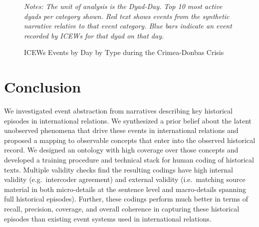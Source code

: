 \documentclass{article}
\begin{document}
\begin{figure}[H]
\caption{ICEWs Events by Day by Type during the Crimea-Donbas Crisis \label{fig:p_precision_icews}}
\textit{Notes: The unit of analysis is the Dyad-Day. Top 10 most active dyads per category shown. Red text shows events from the synthetic narrative relative to that event category. Blue bars indicate an event recorded by ICEWs for that dyad on that day. }
\end{figure}
\clearpage

\hypertarget{conclusion}{%
\section{Conclusion}\label{conclusion}}

We investigated event abstraction from narratives describing key
historical episodes in international relations. We synthesized a prior
belief about the latent unobserved phenomena that drive these events in
international relations and proposed a mapping to observable concepts
that enter into the observed historical record. We designed an ontology
with high coverage over those concepts and developed a training
procedure and technical stack for human coding of historical texts.
Multiple validity checks find the resulting codings have high internal
validity (e.g.~intercoder agreement) and external validity
(i.e.~matching source material in both micro-details at the sentence
level and macro-details spanning full historical episodes). Further,
these codings perform much better in terms of recall, precision,
coverage, and overall coherence in capturing these historical episodes
than existing event systems used in international relations.
\end{document}
